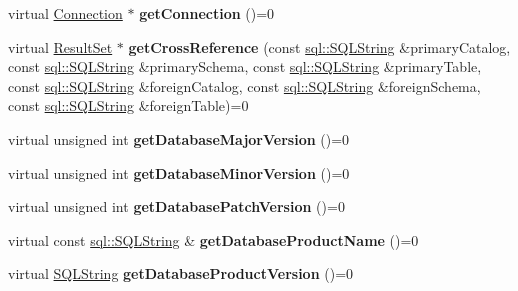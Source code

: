 \begin{DoxyCompactItemize}
\item 
\hypertarget{classsql_1_1_database_meta_data_a3a552c4e9a9f1cdea2bde0336cd3806f}{}\label{classsql_1_1_database_meta_data_a3a552c4e9a9f1cdea2bde0336cd3806f} 
virtual \hyperlink{classsql_1_1_connection}{Connection} $\ast$ {\bfseries get\+Connection} ()=0
\item 
\hypertarget{classsql_1_1_database_meta_data_ab570b099e665fd49254f708bd8ba30c8}{}\label{classsql_1_1_database_meta_data_ab570b099e665fd49254f708bd8ba30c8} 
virtual \hyperlink{classsql_1_1_result_set}{Result\+Set} $\ast$ {\bfseries get\+Cross\+Reference} (const \hyperlink{classsql_1_1_s_q_l_string}{sql\+::\+S\+Q\+L\+String} \&primary\+Catalog, const \hyperlink{classsql_1_1_s_q_l_string}{sql\+::\+S\+Q\+L\+String} \&primary\+Schema, const \hyperlink{classsql_1_1_s_q_l_string}{sql\+::\+S\+Q\+L\+String} \&primary\+Table, const \hyperlink{classsql_1_1_s_q_l_string}{sql\+::\+S\+Q\+L\+String} \&foreign\+Catalog, const \hyperlink{classsql_1_1_s_q_l_string}{sql\+::\+S\+Q\+L\+String} \&foreign\+Schema, const \hyperlink{classsql_1_1_s_q_l_string}{sql\+::\+S\+Q\+L\+String} \&foreign\+Table)=0
\item 
\hypertarget{classsql_1_1_database_meta_data_a5833613db9575c1fb36c777787c04c87}{}\label{classsql_1_1_database_meta_data_a5833613db9575c1fb36c777787c04c87} 
virtual unsigned int {\bfseries get\+Database\+Major\+Version} ()=0
\item 
\hypertarget{classsql_1_1_database_meta_data_affe64c548dab5cbcdbc61eb02c3789d9}{}\label{classsql_1_1_database_meta_data_affe64c548dab5cbcdbc61eb02c3789d9} 
virtual unsigned int {\bfseries get\+Database\+Minor\+Version} ()=0
\item 
\hypertarget{classsql_1_1_database_meta_data_aa9b5db63d73ea348c3c911358388a934}{}\label{classsql_1_1_database_meta_data_aa9b5db63d73ea348c3c911358388a934} 
virtual unsigned int {\bfseries get\+Database\+Patch\+Version} ()=0
\item 
\hypertarget{classsql_1_1_database_meta_data_aada5735541b87d374d08b96a97665f68}{}\label{classsql_1_1_database_meta_data_aada5735541b87d374d08b96a97665f68} 
virtual const \hyperlink{classsql_1_1_s_q_l_string}{sql\+::\+S\+Q\+L\+String} \& {\bfseries get\+Database\+Product\+Name} ()=0
\item 
\hypertarget{classsql_1_1_database_meta_data_a3bee431aa9a025dc089e7a43a6c33254}{}\label{classsql_1_1_database_meta_data_a3bee431aa9a025dc089e7a43a6c33254} 
virtual \hyperlink{classsql_1_1_s_q_l_string}{S\+Q\+L\+String} {\bfseries get\+Database\+Product\+Version} ()=0
\item 

\end{DoxyCompactItemize}
